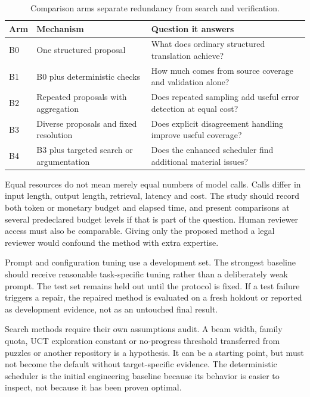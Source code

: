 \begin{table}[htbp]
\centering\small
\caption{Comparison arms separate redundancy from search and verification.}
\begin{tabularx}{\textwidth}{P{16mm}YY}
\toprule
Arm & Mechanism & Question it answers\\
\midrule
B0 & One structured proposal & What does ordinary structured translation achieve?\\
B1 & B0 plus deterministic checks & How much comes from source coverage and validation alone?\\
B2 & Repeated proposals with aggregation & Does repeated sampling add useful error detection at equal cost?\\
B3 & Diverse proposals and fixed resolution & Does explicit disagreement handling improve useful coverage?\\
B4 & B3 plus targeted search or argumentation & Does the enhanced scheduler find additional material issues?\\
\bottomrule
\end{tabularx}
\end{table}

Equal resources do not mean merely equal numbers of model calls. Calls differ in
input length, output length, retrieval, latency and cost. The study should record
both token or monetary budget and elapsed time, and present comparisons at
several predeclared budget levels if that is part of the question. Human reviewer
access must also be comparable. Giving only the proposed method a legal reviewer
would confound the method with extra expertise.

Prompt and configuration tuning use a development set. The strongest baseline
should receive reasonable task-specific tuning rather than a deliberately weak
prompt. The test set remains held out until the protocol is fixed. If a test
failure triggers a repair, the repaired method is evaluated on a fresh holdout or
reported as development evidence, not as an untouched final result.

Search methods require their own assumptions audit. A beam width, family quota,
UCT exploration constant or no-progress threshold transferred from puzzles or
another repository is a hypothesis. It can be a starting point, but must not
become the default without target-specific evidence. The deterministic scheduler
is the initial engineering baseline because its behavior is easier to inspect,
not because it has been proven optimal.

